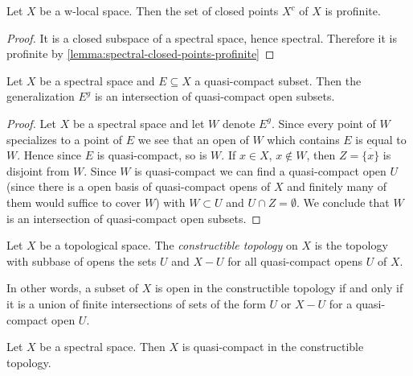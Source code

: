 \begin{lemma}
    Let $X$ be a w-local space. Then the set of closed points $X^c$ of $X$ is profinite.
    \label{lemma:w-local-closed-points-profinite}
\end{lemma}

\begin{proof}
    It is a closed subspace of a spectral space, hence spectral. Therefore it is profinite by
    \ref{lemma:spectral-closed-points-profinite}
\end{proof}

\begin{lemma}
  Let $X$ be a spectral space and $E \subseteq X$ a quasi-compact subset. Then the generalization $E^g$ is an intersection of quasi-compact open subsets.
  \label{lemma:spectral-generalization-intersection-open}
\end{lemma}

\begin{proof}
  Let $X$ be a spectral space and let $W$ denote $E^g$. Since every point of $W$ specializes to a point of $E$ we see that an open of $W$ which contains $E$ is equal to $W$. Hence since $E$ is quasi-compact, so is $W$. If $x \in X$, $x \notin W$, then $Z = \overline{\{x\}}$ is disjoint from $W$. Since $W$ is quasi-compact we can find a quasi-compact open $U$ (since there is a open basis of quasi-compact opens of $X$ and finitely many of them would suffice to cover $W$) with $W \subset U$ and $U \cap Z = \emptyset$. We conclude that $W$ is an intersection of quasi-compact open subsets.
\end{proof}

\begin{definition}
    Let $X$ be a topological space. The \emph{constructible topology} on $X$
    is the topology with subbase of opens the sets $U$ and $X - U$ for
    all quasi-compact opens $U$ of $X$.
    \label{def:constructible-topology}
    \leanok
\end{definition}

In other words, a subset of $X$ is open in the constructible topology if and only if
it is a union of finite intersections of sets of the form $U$ or $X - U$ for
a quasi-compact open $U$.

\begin{lemma}[\stacksproject{0901}]
    Let $X$ be a spectral space. Then $X$ is quasi-compact in the constructible topology.
    \label{lemma:spectral-constructible-quasi-compact}
    \leanok
\end{lemma}

